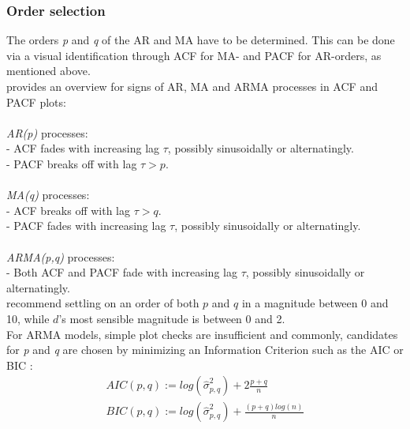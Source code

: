 \documentclass[a4paper, 11pt]{article}
\begin{document}
\subsubsection{Order selection}
The orders \textit{p} and \textit{q} of the AR and MA have to be determined. This can be done via a visual identification through ACF for MA- and PACF for AR-orders, as mentioned above. \\
\cite{Vogel.2015} provides an overview for signs of AR, MA and ARMA processes in ACF and PACF plots: \\
\\
\textit{AR(p)} processes:\\
- ACF fades with increasing lag $\tau$, possibly sinusoidally or alternatingly.\\
- PACF breaks off with lag $\tau > p$.\\
\\
\textit{MA(q)} processes:\\
- ACF breaks off with lag $\tau > q$.\\
- PACF fades with increasing lag $\tau$, possibly sinusoidally or alternatingly.\\
\\
\textit{ARMA(p,q)} processes: \\
- Both ACF and PACF fade with increasing lag $\tau$, possibly sinusoidally or alternatingly.\\


\cite{Zhou.2006} recommend settling on an order of both $p$ and $q$ in a magnitude between 0 and 10, while $d$'s most sensible magnitude is between 0 and 2.\\
For ARMA models, simple plot checks are insufficient and commonly, candidates for \textit{p} and \textit{q} are chosen by minimizing an Information Criterion such as 
the AIC or BIC \citep{Falk.2012}:
\begin{align}
	AIC(p,q) := log(\hat{\sigma}^{2}_{p,q}) + 2 \frac{p + q}{n}\\
	BIC(p,q) := log(\hat{\sigma}^{2}_{p,q}) +  \frac{(p + q)log(n)}{n}\\
\end{align}
\end{document}
